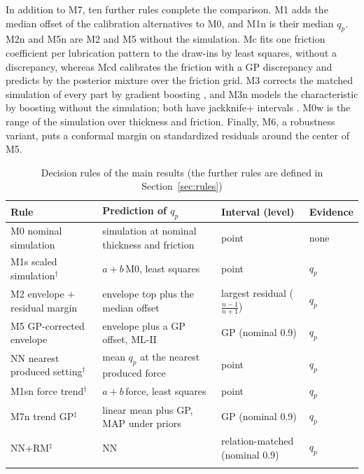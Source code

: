 \documentclass[pdflatex,sn-basic,lineno]{sn-jnl}
\newcommand{\tabsize}{\fontsize{8}{9.5}\selectfont}
\begin{document}
In addition to M7, ten further rules complete the comparison. M1 adds the median offset of the calibration alternatives to M0, and M1n is their median $q_p$. M2n and M5n are M2 and M5 without the simulation. Mc fits one friction coefficient per lubrication pattern to the draw-ins by least squares, without a discrepancy, whereas Mcd calibrates the friction with a GP discrepancy \citep{kennedy2001bayesian} and predicts by the posterior mixture over the friction grid. M3 corrects the matched simulation of every part by gradient boosting \citep{friedman2001greedy}, and M3n models the characteristic by boosting without the simulation; both have jackknife+ intervals \citep{barber2021predictive}. M0w is the range of the simulation over thickness and friction. Finally, M6, a robustness variant, puts a conformal margin on standardized residuals around the center of M5.

\begin{table}[t]
\tabsize
\setlength{\tabcolsep}{3.5pt}
\caption{Decision rules of the main results (the further rules are defined in Section~\ref{sec:rules})}\label{tab:rules}
\begin{tabular}{@{}L{3.6cm}L{4.6cm}L{2.3cm}L{1.4cm}@{}}
\toprule
Rule & Prediction of $q_p$ & Interval (level) & Evidence \\
\midrule
M0 nominal simulation & simulation at nominal thickness and friction & point & none \\
M1s scaled simulation$^\dagger$ & $a+b\,$M0, least squares & point & $q_p$ \\
M2 envelope + residual margin & envelope top plus the median offset & largest residual ($\frac{n-1}{n+1}$) & $q_p$ \\
M5 GP-corrected envelope & envelope plus a GP offset, ML-II & GP (nominal 0.9) & $q_p$ \\
NN nearest produced setting$^\dagger$ & mean $q_p$ at the nearest produced force & point & $q_p$ \\
M1sn force trend$^\dagger$ & $a+b\,$force, least squares & point & $q_p$ \\
M7n trend GP$^\ddagger$ & linear mean plus GP, MAP under priors & GP (nominal 0.9) & $q_p$ \\
NN+RM$^\ddagger$ & NN & relation-matched (nominal 0.9) & $q_p$ \\
\botrule
\end{tabular}
\end{table}
\end{document}
